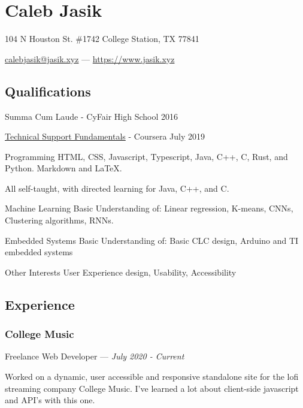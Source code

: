 \documentclass[letterpaper,10pt]{article}
\begin{document}
    \section{\Huge Caleb Jasik}\label{sec:hugecaleb-jasik}

    \hfill 104 N Houston St. \#1742 College Station, TX 77841

    \hfill \href{mailto:calebjasik@jasik.xyz}{calebjasik@jasik.xyz} ---
    \href{https://jasik.xyz}{https://www.jasik.xyz}

    \subsection{Qualifications}\label{subsec:qualifications}

    Summa Cum Laude - CyFair High School 2016

    \href{https://www.coursera.org/account/accomplishments/verify/GZEYJ5VA2YGH}{Technical Support Fundamentals} - Coursera July 2019

    \begin{skills}
        \item[Programming]
        HTML, CSS, Javascript, Typescript, Java, C++, C, Rust, and Python. Markdown and LaTeX.

        All self-taught, with directed learning for Java, C++, and C\@.
        \item[Machine Learning]
        Basic Understanding of: Linear regression, K-means, CNNs, Clustering algorithms, RNNs.
        \item[Embedded Systems]
        Basic Understanding of: Basic CLC design, Arduino and TI embedded systems
        \item[Other Interests]
        User Experience design, Usability, Accessibility
    \end{skills}


    \subsection{Experience}\label{subsec:experience}

    \subsubsection{College Music}
    \hfill Freelance Web Developer --- \emph{July 2020 - Current}

    Worked on a dynamic, user accessible and responsive standalone site for the lofi streaming company College Music. I've learned a lot about client-side javascript and API's with this one.
\end{document}
